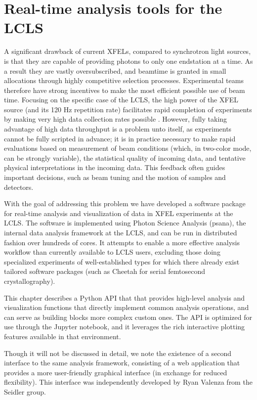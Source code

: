 \chapter{Real-time analysis tools for the LCLS}
\label{xap}

A significant drawback of current XFELs, compared to synchrotron light sources, is that they are capable of providing photons to only one endstation at a time. As a result they are vastly oversubscribed, and beamtime is granted in small allocations through highly competitive selection processes. Experimental teams therefore have strong incentives to make the most efficient possible use of beam time. Focusing on the specific case of the LCLS, the high power of the XFEL source (and its 120 Hz repetition rate) facilitates rapid completion of experiments by making very high data collection rates possible . However, fully taking advantage of high data throughput is a problem unto itself, as experiments cannot be fully scripted in advance; it is in practice necessary to make rapid evaluations based on measurement of beam conditions (which, in two-color mode, can be strongly variable), the statistical quality of incoming data, and tentative physical interpretations in the incoming data. This feedback often guides important decisions, such as beam tuning and the motion of samples and detectors. 

With the goal of addressing this problem we have developed a software package for real-time analysis and visualization of data in XFEL experiments at the LCLS. The software is implemented using Photon Science Analysis (psana), the internal data analysis framework at the LCLS, and can be run in distributed fashion over hundreds of cores. \cite{damiani2016linac} It attempts to enable a more effective analysis workflow than currently available to LCLS users, excluding those doing specialized experiments of well-established types for which there already exist tailored software packages (such as Cheetah for serial femtosecond crystallography). \cite{barty2014cheetah}

This chapter describes a Python API that that provides high-level analysis and visualization functions that directly implement common analysis operations, and can serve as building blocks more complex custom ones. The API is optimized for use through the Jupyter notebook, and it leverages the rich interactive plotting features available in that environment.

Though it will not be discussed in detail, we note the existence of a second interface to the same analysis framework, consisting of a web application that provides a more user-friendly graphical interface (in exchange for reduced flexibility). This interface was independently developed by Ryan Valenza from the Seidler group.




